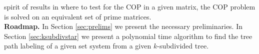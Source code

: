 \documentclass[a4paper,UKenglish,numberwithinsect]{lipics} %
\def\cF{{\cal F}}
\def\cH{{\cal H}}
\def\F{{\mathcal F}}
\begin{document}
spirit of results in \cite{wlh02,nsnrs09} where to test for the COP in
a given matrix,
the COP problem is solved on an equivalent set of prime matrices.  \\
{\bf Roadmap.} In Section \ref{sec:prelims} we present the necessary
preliminaries.
In Section \ref{sec:ksubdivstar} we present a polynomial time
algorithm to find the tree path labeling of a given set system from a
given $k$-subdivided tree.





\end{document}

